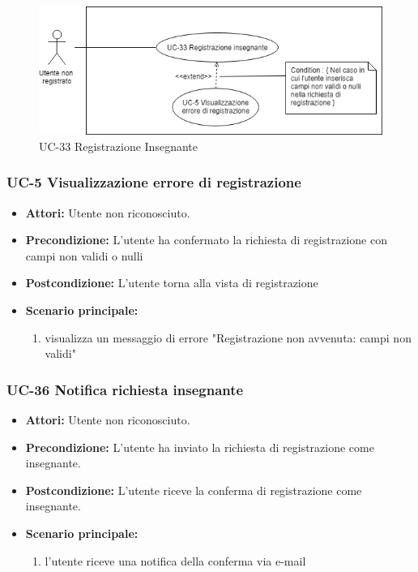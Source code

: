 \begin{figure}[h]
	\centering
	\includegraphics[scale=0.7]{images/UC-1i.png}
	\caption{UC-33 Registrazione Insegnante}
\end{figure}	

\subsubsection{UC-5 Visualizzazione errore di registrazione}
\begin{itemize}
	\item \textbf{Attori:} Utente non riconosciuto.
	\item \textbf{Precondizione:} L'utente ha confermato la richiesta di registrazione con campi non validi o nulli
	\item \textbf{Postcondizione:} L'utente torna alla vista di registrazione
	\item  \textbf{Scenario principale: }
	\begin{enumerate}
		\item visualizza un messaggio di errore "Registrazione non avvenuta: campi non validi"
	\end{enumerate}
\end{itemize}

\subsubsection{UC-36 Notifica richiesta insegnante}
   \begin{itemize}
   \item \textbf{Attori:} Utente non riconosciuto.
   \item \textbf{Precondizione:} L'utente ha inviato la richiesta di registrazione come insegnante.
   \item \textbf{Postcondizione:} L'utente riceve la conferma di registrazione come insegnante. 
   \item \textbf{Scenario principale:}
    \begin{enumerate}
     \item l'utente riceve una notifica della conferma via e-mail
    \end{enumerate}
  \end{itemize}

